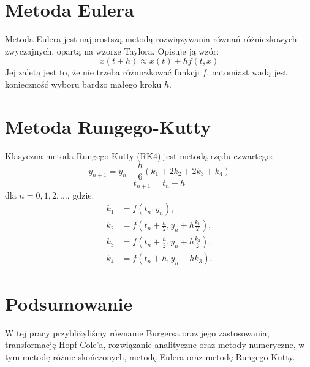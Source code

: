 \documentclass[a4paper,12pt]{article}
\begin{document}
\section{Metoda Eulera}
Metoda Eulera jest najprostszą metodą rozwiązywania równań różniczkowych zwyczajnych, opartą na wzorze Taylora. Opisuje ją wzór:
\begin{equation}
x(t+h) \approx x(t) + hf(t,x)
\end{equation}
Jej zaletą jest to, że nie trzeba różniczkować funkcji $f$, natomiast wadą jest konieczność wyboru bardzo małego kroku $h$.

\section{Metoda Rungego-Kutty}
Klasyczna metoda Rungego-Kutty (RK4) jest metodą rzędu czwartego:
\begin{equation}
y_{n+1} = y_n + \frac{h}{6}(k_1 + 2k_2 + 2k_3 + k_4)
\end{equation}
\begin{equation}
t_{n+1} = t_n + h
\end{equation}
dla $n=0,1,2,\ldots$, gdzie:
\begin{align*}
k_1 &= f(t_n, y_n), \\
k_2 &= f(t_n + \frac{h}{2}, y_n + h\frac{k_1}{2}), \\
k_3 &= f(t_n + \frac{h}{2}, y_n + h\frac{k_2}{2}), \\
k_4 &= f(t_n + h, y_n + hk_3).
\end{align*}

\section{Podsumowanie}
W tej pracy przybliżyliśmy równanie Burgersa oraz jego zastosowania, transformację Hopf-Cole'a, rozwiązanie analityczne oraz metody numeryczne, w tym metodę różnic skończonych, metodę Eulera oraz metodę Rungego-Kutty.
\end{document}

